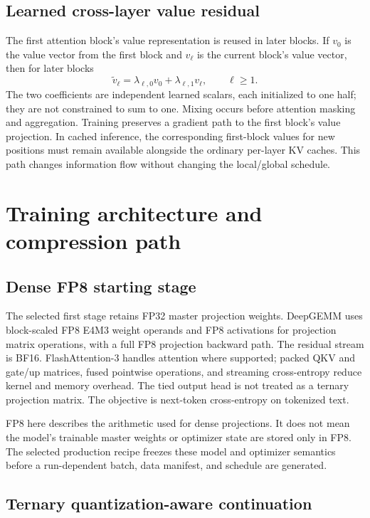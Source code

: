 \documentclass[11pt]{article}
\begin{document}
\subsection{Learned cross-layer value residual}

The first attention block's value representation is reused in later blocks.
If $v_0$ is the value vector from the first block and $v_\ell$ is the
current block's value vector, then for later blocks
\[
  \widetilde v_\ell
  =\lambda_{\ell,0}v_0+\lambda_{\ell,1}v_\ell,
  \qquad \ell\geq 1.
\]
The two coefficients are independent learned scalars, each initialized to
one half; they are not constrained to sum to one. Mixing occurs before
attention masking and aggregation. Training preserves a gradient path to
the first block's value projection. In cached inference, the corresponding
first-block values for new positions must remain available alongside the
ordinary per-layer KV caches. This path changes information flow without
changing the local/global schedule.

\section{Training architecture and compression path}

\subsection{Dense FP8 starting stage}

The selected first stage retains FP32 master projection weights. DeepGEMM
uses block-scaled FP8 E4M3 weight operands and FP8 activations for projection
matrix operations, with a full FP8 projection backward path. The residual
stream is BF16. FlashAttention-3 handles attention where supported; packed
QKV and gate/up matrices, fused pointwise operations, and streaming
cross-entropy reduce kernel and memory overhead. The tied output head is
not treated as a ternary projection matrix. The objective is next-token
cross-entropy on tokenized text.

FP8 here describes the arithmetic used for dense projections. It does not
mean the model's trainable master weights or optimizer state are stored
only in FP8. The selected production recipe freezes these model and
optimizer semantics before a run-dependent batch, data manifest, and
schedule are generated.

\subsection{Ternary quantization-aware continuation}
\end{document}
